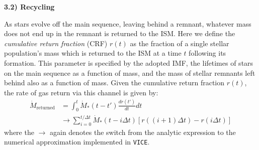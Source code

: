 \documentclass{report}
\begin{document}
\noindent
\hypertarget{sec:recycling}{\textbf{3.2) Recycling}} \par\noindent
As stars evolve off the main sequence, leaving behind a remnant, whatever mass 
does not end up in the remnant is returned to the ISM. Here we define the 
\textit{cumulative return fraction} (CRF) $r(t)$ as the fraction of a single 
stellar population's mass which is returned to the ISM at a time $t$ following 
its formation. This parameter is specified by the adopted IMF, the lifetimes 
of stars on the main sequence as a function of mass, and the mass of stellar 
remnants left behind also as a function of mass. Given the cumulative return 
fraction $r(t)$, the rate of gas return via this channel is given by: 
\begin{subequations}\begin{align}
\dot{M}_\text{returned} &= \int_0^t \dot{M}_*(t - t')\frac{dr(t')}{dt}dt \\ 
\label{eq:crf_numerical}
&\rightarrow \sum_{i = 0}^{t/\Delta t}\dot{M}_*(t - i\Delta t)
[r((i + 1)\Delta t) - r(i\Delta t)]
\end{align}\end{subequations}
where the $\rightarrow$ again denotes the switch from the analytic expression 
to the numerical approximation implemented in \texttt{VICE}. 
\par
\end{document}
